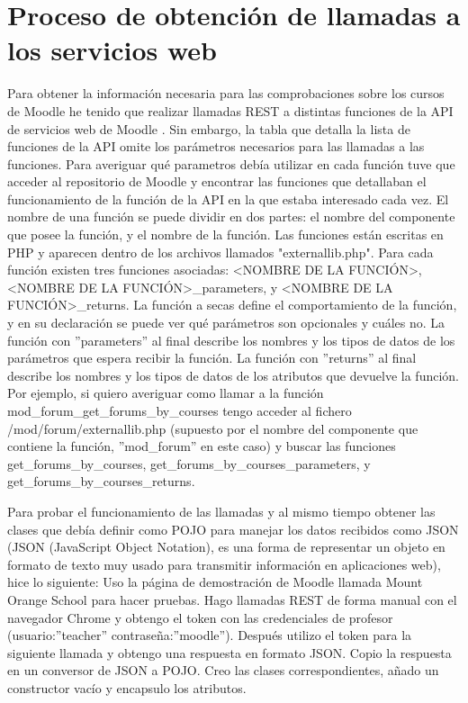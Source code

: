 \section{Proceso de obtención de llamadas a los servicios web}
Para obtener la información necesaria para las comprobaciones sobre los cursos de Moodle he tenido que realizar llamadas REST a distintas funciones de la API de servicios web de Moodle \cite{wsapifunctions-2021}. Sin embargo, la tabla que detalla la lista de funciones de la API omite los parámetros necesarios para las llamadas a las funciones.
Para averiguar qué parametros debía utilizar en cada función tuve que acceder al repositorio de Moodle \cite{moodlerepository-2022} y encontrar las funciones que detallaban el funcionamiento de la función de la API en la que estaba interesado cada vez.
El nombre de una función se puede dividir en dos partes: el nombre del componente que posee la función, y el nombre de la función. Las funciones están escritas en PHP y aparecen dentro de los archivos llamados "externallib.php". Para cada función existen tres funciones asociadas: <NOMBRE DE LA FUNCIÓN>, <NOMBRE DE LA FUNCIÓN>\_parameters, y <NOMBRE DE LA FUNCIÓN>\_returns.
La función a secas define el comportamiento de la función, y en su declaración se puede ver qué parámetros son opcionales y cuáles no.
La función con ''parameters'' al final describe los nombres y los tipos de datos de los parámetros que espera recibir la función.
La función con ''returns'' al final describe los nombres y los tipos de datos de los atributos que devuelve la función.
Por ejemplo, si quiero averiguar como llamar a la función mod\_forum\_get\_forums\_by\_courses
tengo acceder al fichero /mod/forum/externallib.php (supuesto por el nombre del componente que contiene la función, ''mod\_forum'' en este caso) y buscar las funciones get\_forums\_by\_courses, get\_forums\_by\_courses\_parameters, y get\_forums\_by\_courses\_returns.

Para probar el funcionamiento de las llamadas y al mismo tiempo obtener las clases que debía definir como POJO para manejar los datos recibidos como JSON (JSON (JavaScript Object Notation), es una forma de representar un objeto en formato de texto muy usado para transmitir información en aplicaciones web), hice lo siguiente:
Uso la página de demostración de Moodle llamada Mount Orange School para hacer pruebas.
Hago llamadas REST de forma manual con el navegador Chrome y obtengo el token con las credenciales de profesor (usuario:''teacher'' contraseña:''moodle''). Después utilizo el token para la siguiente llamada y obtengo una respuesta en formato JSON.  Copio la respuesta en un conversor de JSON a POJO. Creo las clases correspondientes, añado un constructor vacío y encapsulo los atributos. 


